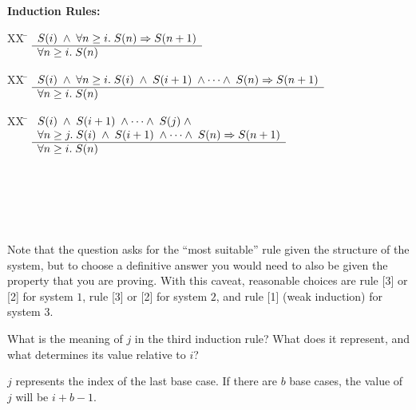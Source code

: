 \documentclass[]{exam}
\begin{document}
\begin{questions}
\begin{multicols}{2}
\columnbreak
{\bf Induction Rules:}\\
\begin{tabbing}
[1]XX \=  \kill
[1] \>
	\(\begin{array}[t]{l}
	S(i) \;\wedge\; \forall n \geq i.\;S(n) \Rightarrow S(n+1) \\
	\hline
	\forall n \geq i. \; S(n)
	\end{array}\) %
\end{tabbing}

\begin{tabbing}
[2]XX \=  \kill
[2] \>
	\(\begin{array}[t]{l}
	S(i) \;\wedge\; \forall n \geq i.\;S(i)\;\wedge\;S(i+1)\;\wedge\cdots\wedge\;S(n) \Rightarrow S(n+1) \\
	\hline
	\forall n \geq i. \; S(n)
	\end{array}\)
\end{tabbing}

\begin{tabbing}
[3]XX \=  \kill
[3] \>
	\(\begin{array}[t]{l}
	S(i) \;\wedge\; S(i+1)\;\wedge\cdots\wedge\;S(j)\;\wedge\; \\
\forall n \geq j.\;S(i)\;\wedge\;S(i+1)\;\wedge\cdots\wedge\;S(n) \Rightarrow S(n+1) \\
	\hline
	\forall n \geq i. \; S(n)
	\end{array}\) %
\end{tabbing}
~\\
~\\
~\\
~\\
    
\end{multicols}
\begin{solution}
Note that the question asks for the ``most suitable'' rule given
the structure of the system, but to choose a definitive answer you would need to
also be given the property that you are proving. With this caveat, reasonable
choices are rule [3] or [2] for system $1$, rule [3] or [2] for system $2$, and 
rule [1] (weak induction) for system $3$. 
\end{solution}

\question What is the meaning of $j$ in the third induction rule? What does it
represent, and what determines its value relative to $i$?
\begin{solution}
$j$ represents the index of the last base case. If there are
$b$ base cases, the value of $j$ will be $i + b - 1$.
\end{solution}



\end{questions}
\end{document}

